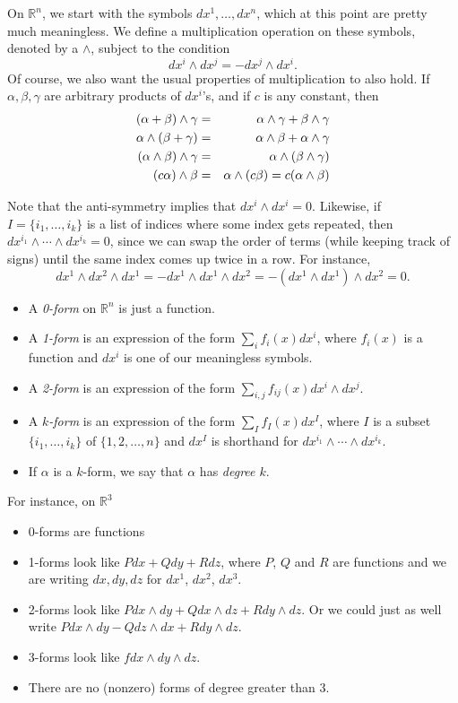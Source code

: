 \documentclass[12pt]{amsbook}
\newcommand{\R}{{\mathbb R}}
\theoremstyle{definition}
\begin{document}
On $\R^n$, we start with the symbols $dx^1, \ldots, dx^n$, which at this point
are pretty much meaningless. We define a multiplication operation on
these symbols, denoted by a $\wedge$, subject to the condition
$$ dx^i \wedge dx^j = - dx^j \wedge dx^i.$$
Of course, we also want the usual properties of multiplication to also hold.
If $\alpha, \beta, \gamma$ are arbitrary products of $dx^i$'s, and if $c$
is any constant, then
\begin{eqnarray}
(\alpha + \beta) \wedge \gamma & = & \alpha \wedge \gamma 
+ \beta \wedge \gamma\cr
\alpha \wedge (\beta+\gamma) & = & \alpha \wedge \beta + \alpha \wedge \gamma \cr
(\alpha \wedge \beta) \wedge \gamma & = & \alpha \wedge (\beta \wedge \gamma) \cr
(c \alpha) \wedge \beta & = & \alpha \wedge (c \beta) = c(\alpha \wedge \beta)
\end{eqnarray}

Note that the anti-symmetry implies that $dx^i \wedge dx^i = 0$. 
Likewise, if $I = \{i_1,
\ldots, i_k\}$ is a list of indices where some index gets repeated, 
then $dx^{i_1}\wedge \cdots \wedge dx^{i_k}=0$, since we can swap the order
of terms (while keeping track of signs) until the same index comes up twice
in a row. For instance, 
$$ dx^1 \wedge dx^2 \wedge dx^1 = - dx^1 \wedge dx^1 \wedge dx^2 = 
-(dx^1 \wedge dx^1) \wedge dx^2 = 0.$$
  
\begin{itemize}
\item
A {\em 0-form} on $\R^n$ is just a function.
\item A {\em 1-form} is an expression of the form $\sum_i f_i(x) dx^i$, 
where $f_i(x)$ is a function and $dx^i$ is one of our meaningless symbols.
\item A {\em 2-form} is an expression of the form $\sum_{i,j} f_{ij}(x) dx^i
\wedge dx^j$. 
\item A {\em $k$-form} is an expression of the form $\sum_I f_I(x) dx^I$,
where $I$ is a subset $\{i_1,\ldots,i_k\}$ of $\{1,2,\ldots,n\}$ and 
$dx^I$ is shorthand for $dx^{i_1} \wedge \cdots \wedge dx^{i_k}$. 
\item If $\alpha$ is a $k$-form, we say that $\alpha$ has {\em degree $k$}. 
\end{itemize}

For instance, on $\R^3$
\begin{itemize}
\item 0-forms are functions
\item 1-forms look like $P dx + Q dy + R dz$, where $P$, $Q$ and $R$ are
functions and we are writing $dx, dy, dz$ for $dx^1$, $dx^2$, $dx^3$. 
\item 2-forms look like $P dx\wedge dy + Q dx \wedge dz + R dy \wedge dz$. 
Or we could just as well write $P dx \wedge dy - Q dz \wedge dx + R
dy \wedge dz$. 
\item 3-forms look like $f dx \wedge dy \wedge dz$. 
\item There are no (nonzero) forms of degree greater than 3.
\end{itemize}
\end{document}
